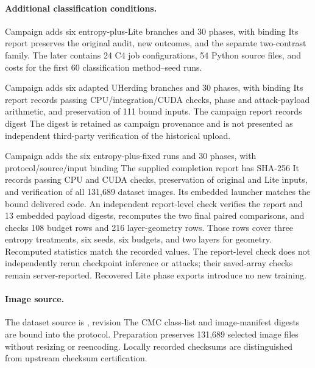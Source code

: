 \paragraph{Additional classification conditions.}
Campaign  adds six
entropy-plus-Lite branches and 30 phases, with binding
Its report preserves the original audit, new outcomes,
and the separate two-contrast family.
The later  contains 24 C4
job configurations, 54 Python source files, and costs
for the first 60 classification method--seed runs.

Campaign  adds six adapted UHerding
branches and 30 phases, with binding
Its report records passing CPU/integration/CUDA checks,
phase and attack-payload arithmetic, and preservation of
111 bound inputs. The campaign report records digest
The digest is retained as campaign provenance and is not presented as independent third-party verification of the historical upload.


Campaign  adds the six entropy-plus-fixed
runs and 30 phases, with protocol/source/input binding
The supplied completion report has SHA-256
It records passing CPU and CUDA checks, preservation of original and
Lite inputs, and verification of all 131,689 dataset images. Its embedded
launcher matches the bound delivered code. An independent report-level
check verifies the report and 13 embedded payload digests, recomputes
the two final paired comparisons, and checks 108 budget rows and 216
layer-geometry rows. Those rows cover three entropy treatments, six
seeds, six budgets, and two layers for geometry. Recomputed statistics
match the recorded values. The report-level check does not independently
rerun checkpoint inference or attacks; their saved-array checks remain
server-reported. Recovered Lite phase exports introduce no new training.

\paragraph{Image source.}
The dataset source is ,
revision
The CMC class-list and image-manifest digests are bound
into the protocol.
Preparation preserves 131,689 selected image files
without resizing or reencoding.
Locally recorded checksums are distinguished from
upstream checksum certification.

